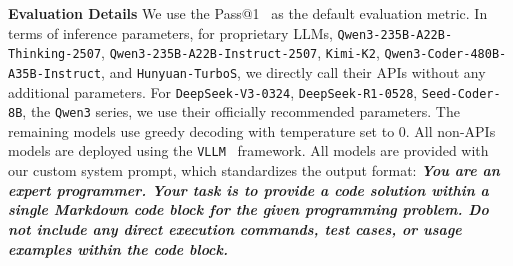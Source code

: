 

\textbf{Evaluation Details} We use the Pass@1~\citep{chen2021evaluatinglargelanguagemodels} as the default evaluation metric. In terms of inference parameters, for proprietary LLMs, \texttt{Qwen3-235B-A22B-Thinking-}\texttt{2507}, \texttt{Qwen3-235B-A22B-Instruct-2507}, \texttt{Kimi-K2}, \texttt{Qwen3-Coder-480B-A35B-Instruct}, and \texttt{Hunyuan-TurboS}, we directly call their APIs without any additional parameters. For \texttt{DeepSeek-V3-0324}, \texttt{DeepSeek-R1-0528}, \texttt{Seed-Coder-8B}, the \texttt{Qwen3} series, we use their officially recommended parameters. The remaining models use greedy decoding with temperature set to 0. All non-APIs models are deployed using the \texttt{VLLM}~\citep{kwon2023efficient} framework. All models are provided with our custom system prompt, which standardizes the output format: \textbf{\textit{You are an expert programmer. Your task is to provide a code solution within a single Markdown code block for the given programming problem. Do not include any direct execution commands, test cases, or usage examples within the code block.}}












